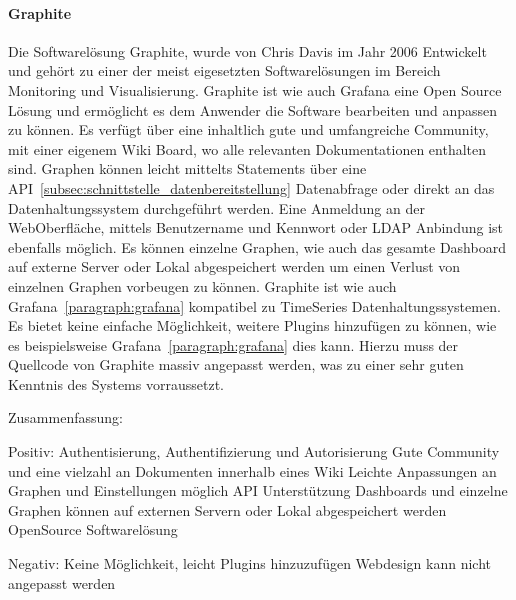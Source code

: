 \paragraph{Graphite}
\label{paragraph:graphite}
Die Softwarelösung Graphite, wurde von Chris Davis im Jahr 2006 Entwickelt und
gehört zu einer der meist eigesetzten Softwarelösungen im Bereich Monitoring
und Visualisierung. Graphite ist wie auch Grafana eine Open Source Lösung und
ermöglicht es dem Anwender die Software bearbeiten und anpassen zu können. Es
verfügt über eine inhaltlich gute und umfangreiche Community, mit einer eigenem
Wiki Board, wo alle relevanten Dokumentationen enthalten sind. Graphen können
leicht mittelts Statements über eine
API~\ref{subsec:schnittstelle_datenbereitstellung} Datenabfrage oder direkt an das
Datenhaltungssystem durchgeführt werden. Eine Anmeldung an der WebOberfläche,
mittels Benutzername und Kennwort oder LDAP Anbindung ist ebenfalls möglich.
Es können einzelne Graphen, wie auch das gesamte Dashboard auf externe Server
oder Lokal abgespeichert werden um einen Verlust von einzelnen Graphen
vorbeugen zu können. Graphite ist wie auch Grafana~\ref{paragraph:grafana}
kompatibel zu TimeSeries Datenhaltungssystemen. Es bietet keine einfache
Möglichkeit, weitere Plugins hinzufügen zu können, wie es beispielsweise
Grafana~\ref{paragraph:grafana} dies kann. Hierzu muss der Quellcode von
Graphite massiv angepasst werden, was zu einer sehr guten Kenntnis des Systems
vorraussetzt.


Zusammenfassung:
\begin{outline}
  Positiv:
  \1 Authentisierung, Authentifizierung und Autorisierung
  \1 Gute Community und eine vielzahl an Dokumenten innerhalb eines Wiki
  \1 Leichte Anpassungen an Graphen und Einstellungen möglich
  \1 API Unterstützung
  \1 Dashboards und einzelne Graphen können auf externen Servern oder Lokal
  abgespeichert werden
  \1 OpenSource Softwarelösung


  Negativ:
  \1 Keine Möglichkeit, leicht Plugins hinzuzufügen
  \1 Webdesign kann nicht angepasst werden
\end{outline}


